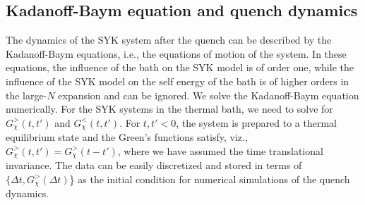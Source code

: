 \subsection{Kadanoff-Baym equation and quench dynamics}
The dynamics of the SYK system after the quench can be described by the Kadanoff-Baym equations, i.e., the equations of motion of the system. In these equations, the influence of the bath on the SYK model is of order one, while the influence of the SYK model on the self energy of the bath is of higher orders in the large-$N$ expansion and can be ignored. We solve the Kadanoff-Baym equation numerically. For the SYK systems in the thermal bath, we need to solve for $G_\chi^{>}(t,t')$ and $G_\chi^{<}(t,t')$. For $t,t'<0$, the system is prepared to a thermal equilibrium state and the Green's functions satisfy, viz., $G_\chi^{>}(t,t')=G_\chi^{>}(t-t')$, where we have assumed the time translational invariance. The data can be easily discretized and stored in terms of $\{{\Delta t}, G_\chi^{>}(\Delta t)$\} as the initial condition for numerical simulations of the quench dynamics. %



